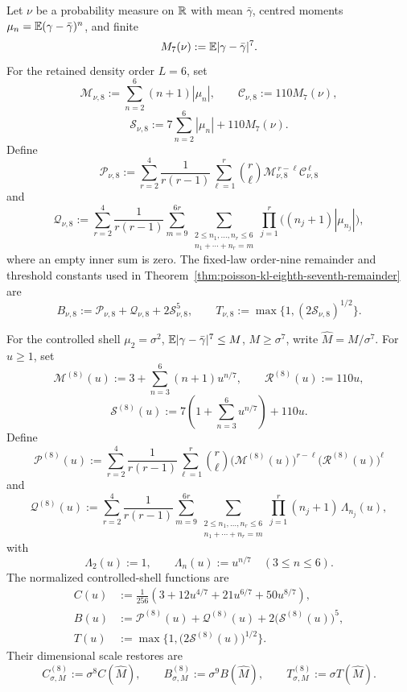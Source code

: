 \begin{definition}[\(N=4,\eta=1\) retained-order constants]
\label{def:n4-finite-time-constant-dictionary}
Let \(\nu\) be a probability measure on \(\mathbb{R}\) with mean \(\bar{\gamma}\),
centred moments \(\mu_n=\mathbb{E}(\gamma-\bar{\gamma})^n\), and finite
\[
M_7(\nu):=\mathbb{E}|\gamma-\bar{\gamma}|^7 .
\]
For the retained density order \(L=6\), set
\[
\mathcal M_{\nu,8}:=\sum_{n=2}^{6}(n+1)|\mu_n|,
\qquad
\mathcal C_{\nu,8}:=110M_7(\nu),
\]
\[
\mathcal S_{\nu,8}:=7\sum_{n=2}^{6}|\mu_n|+110M_7(\nu).
\]
Define
\[
\mathcal P_{\nu,8}:=
\sum_{r=2}^{4}\frac{1}{r(r-1)}
\sum_{\ell=1}^{r}\binom r\ell
\mathcal M_{\nu,8}^{\,r-\ell}\mathcal C_{\nu,8}^{\,\ell}
\]
and
\[
\mathcal Q_{\nu,8}:=
\sum_{r=2}^{4}\frac{1}{r(r-1)}
\sum_{m=9}^{6r}
\sum_{\substack{2\le n_1,\ldots,n_r\le6\\
n_1+\cdots+n_r=m}}
\prod_{j=1}^{r}\bigl((n_j+1)|\mu_{n_j}|\bigr),
\]
where an empty inner sum is zero.  The fixed-law order-nine remainder and
threshold constants used in
Theorem~\ref{thm:poisson-kl-eighth-seventh-remainder} are
\begin{equation}\label{eq:dictionary-fixed-law-n4-constants}
B_{\nu,8}:=\mathcal P_{\nu,8}+\mathcal Q_{\nu,8}
+2\mathcal S_{\nu,8}^{5},
\qquad
T_{\nu,8}:=\max\{1,(2\mathcal S_{\nu,8})^{1/2}\}.
\end{equation}

For the controlled shell \(\mu_2=\sigma^2\),
\(\mathbb{E}|\gamma-\bar{\gamma}|^7\le M\), \(M\ge\sigma^7\), write
\(\widehat M=M/\sigma^7\).  For \(u\ge1\), set
\[
\mathcal M^{(8)}(u)
:=3+\sum_{n=3}^{6}(n+1)u^{n/7},
\qquad
\mathcal R^{(8)}(u):=110u,
\]
\[
\mathcal S^{(8)}(u)
:=7\left(1+\sum_{n=3}^{6}u^{n/7}\right)+110u .
\]
Define
\[
\mathcal P^{(8)}(u):=
\sum_{r=2}^{4}\frac{1}{r(r-1)}
\sum_{\ell=1}^{r}\binom r\ell
\bigl(\mathcal M^{(8)}(u)\bigr)^{r-\ell}
\bigl(\mathcal R^{(8)}(u)\bigr)^\ell
\]
and
\[
\mathcal Q^{(8)}(u):=
\sum_{r=2}^{4}\frac{1}{r(r-1)}
\sum_{m=9}^{6r}
\sum_{\substack{2\le n_1,\ldots,n_r\le6\\
n_1+\cdots+n_r=m}}
\prod_{j=1}^{r}(n_j+1)\,\Lambda_{n_j}(u),
\]
with
\[
\Lambda_2(u):=1,\qquad
\Lambda_n(u):=u^{n/7}\quad(3\le n\le6).
\]
The normalized controlled-shell functions are
\begin{equation}\label{eq:dictionary-normalized-shell-functions}
\begin{aligned}
C(u)
&:=\frac{1}{256}\left(
3+12u^{4/7}+21u^{6/7}+50u^{8/7}
\right),\\
B(u)
&:=\mathcal P^{(8)}(u)+\mathcal Q^{(8)}(u)
+2\bigl(\mathcal S^{(8)}(u)\bigr)^5,\\
T(u)
&:=\max\{1,\bigl(2\mathcal S^{(8)}(u)\bigr)^{1/2}\}.
\end{aligned}
\end{equation}
Their dimensional scale restores are
\begin{equation}\label{eq:dictionary-controlled-shell-c8}
C_{\sigma,M}^{(8)}:=\sigma^8C(\widehat M),\qquad
B_{\sigma,M}^{(8)}:=\sigma^9B(\widehat M),\qquad
T_{\sigma,M}^{(8)}:=\sigma T(\widehat M).
\end{equation}
\end{definition}

